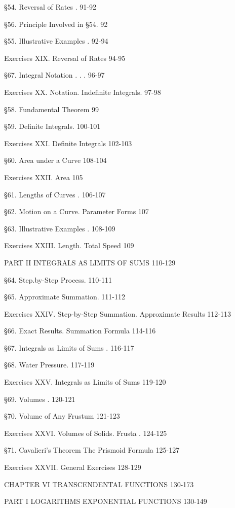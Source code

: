 \documentclass[12pt]{article}
\begin{document}
\S 54. Reversal of Rates . 91-92

\S 56. Principle Involved in \S 54. 92

\S 55. Illustrative Examples . 92-94

Exercises XIX. Reversal of Rates 94-95

\S 67. Integral Notation . . . 96-97

Exercises XX. Notation. Indefinite Integrals. 97-98

\S 58. Fundamental Theorem 99

\S 59. Definite Integrals. 100-101

Exercises XXI. Definite Integrals 102-103

\S 60. Area under a Curve 108-104

Exercises XXII. Area 105

\S 61. Lengths of Curves .  106-107

\S 62. Motion on a Curve. Parameter Forms 107

\S 63. Illustrative Examples . 108-109

Exercises XXIII. Length. Total Speed 109


\begin{center}
PART II INTEGRALS AS LIMITS OF SUMS 110-129
\end{center}

\S 64. Step.by-Step Process. 110-111

\S 65. Approximate Summation. 111-112

Exercises XXIV. Step-by-Step Summation. Approximate Results 112-113


\S 66. Exact Results. Summation Formula 114-116

\S 67. Integrals as Limits of Sums . 116-117

\S 68. Water Pressure. 117-119

Exercises XXV. Integrals as Limits of Sums 119-120

\S 69. Volumes .  120-121

\S 70. Volume of Any Frustum 121-123

Exercises XXVI. Volumes of Solids. Frusta . 124-125

\S 71. Cavalieri's Theorem The Prismoid Formula 125-127

Exercises XXVII. General Exercises 128-129

CHAPTER VI TRANSCENDENTAL FUNCTIONS 130-173

\begin{center}
PART I LOGARITHMS EXPONENTIAL FUNCTIONS 130-149
\end{center}
\end{document}
